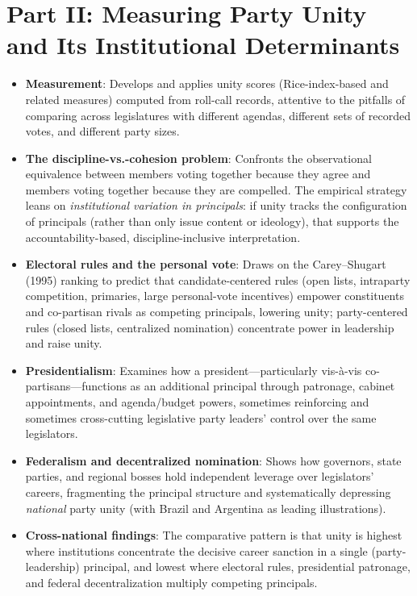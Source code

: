\documentclass[12pt]{article}
\begin{document}
\section{Part II: Measuring Party Unity and Its Institutional Determinants}

\begin{itemize}[leftmargin=*, itemsep=4pt]
    \item \textbf{Measurement}: Develops and applies unity scores (Rice-index-based and related measures) computed from roll-call records, attentive to the pitfalls of comparing across legislatures with different agendas, different sets of recorded votes, and different party sizes.
    \item \textbf{The discipline-vs.-cohesion problem}: Confronts the observational equivalence between members voting together because they agree and members voting together because they are compelled. The empirical strategy leans on \emph{institutional variation in principals}: if unity tracks the configuration of principals (rather than only issue content or ideology), that supports the accountability-based, discipline-inclusive interpretation.
    \item \textbf{Electoral rules and the personal vote}: Draws on the Carey--Shugart (1995) ranking to predict that candidate-centered rules (open lists, intraparty competition, primaries, large personal-vote incentives) empower constituents and co-partisan rivals as competing principals, lowering unity; party-centered rules (closed lists, centralized nomination) concentrate power in leadership and raise unity.
    \item \textbf{Presidentialism}: Examines how a president---particularly vis-\`a-vis co-partisans---functions as an additional principal through patronage, cabinet appointments, and agenda/budget powers, sometimes reinforcing and sometimes cross-cutting legislative party leaders' control over the same legislators.
    \item \textbf{Federalism and decentralized nomination}: Shows how governors, state parties, and regional bosses hold independent leverage over legislators' careers, fragmenting the principal structure and systematically depressing \emph{national} party unity (with Brazil and Argentina as leading illustrations).
    \item \textbf{Cross-national findings}: The comparative pattern is that unity is highest where institutions concentrate the decisive career sanction in a single (party-leadership) principal, and lowest where electoral rules, presidential patronage, and federal decentralization multiply competing principals.
\end{itemize}
\end{document}
